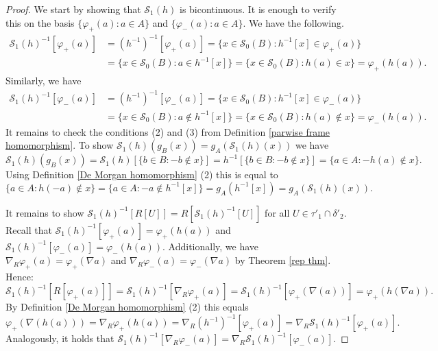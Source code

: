 \documentclass[10pt,a4paper]{amsart}
\begin{document}
\begin{proof}
We start by showing that $\mathcal{S}_1(h)$ is bicontinuous. It is enough to verify this on the basis $\{\varphi_+(a):a\in A\}$ and $\{\varphi_-(a):a\in A\}$.
We have the following.
\begin{align*}
    \mathcal{S}_1(h)^{-1}[\varphi_+(a)]&=(h^{-1})^{-1}[\varphi_+(a)]=\{x \in \mathcal{S}_0(B) : h^{-1}[x] \in \varphi_+(a)\}\\&=\{x \in \mathcal{S}_0(B) : a \in h^{-1}[x]\}=\{x \in \mathcal{S}_0(B) : h(a) \in x\}=\varphi_+(h(a)).
\end{align*}
Similarly, we have
\begin{align*}
    \mathcal{S}_1(h)^{-1}[\varphi_-(a)]&=(h^{-1})^{-1}[\varphi_-(a)]=\{x \in \mathcal{S}_0(B) : h^{-1}[x] \in \varphi_-(a)\}\\&=\{x \in \mathcal{S}_0(B) : a \notin h^{-1}[x]\}=\{x \in \mathcal{S}_0(B) : h(a) \notin x\}=\varphi_-(h(a)).
\end{align*}
It remains to check the conditions (2) and (3) from Definition  \ref{parwise frame homomorphism}.
To show $\mathcal{S}_1(h)(g_B(x))=g_A(\mathcal{S}_1(h)(x))$ we have
$$\mathcal{S}_1(h)(g_B(x))=\mathcal{S}_1(h)[\{b \in B : -b \notin x\}]=h^{-1}[\{b \in B : -b \notin x\}]=\{a \in A : -h(a) \notin x\}.$$ Using Definition \ref{De Morgan homomorphism} (2) this is equal to 
$$\{a \in A : h(-a) \notin x\}=\{a \in A : -a \notin h^{-1}[x]\}=g_A(h^{-1}[x])=g_A(\mathcal{S}_{1}(h)(x)).$$

It remains to show $\mathcal{S}_1(h)^{-1}[R[U]]=R[\mathcal{S}_1(h)^{-1}[U]]$ for all $U \in \tau'_1 \cap \delta'_2$. Recall that $\mathcal{S}_1(h)^{-1}[\varphi_+(a)]=\varphi_+(h(a))$ and $\mathcal{S}_1(h)^{-1}[\varphi_-(a)]=\varphi_-(h(a))$. Additionally, we have $\nabla_R\varphi_+(a)=\varphi_+(\nabla a)$ and $\nabla_R\varphi_-(a)=\varphi_-(\nabla a)$ by Theorem \ref{rep thm}. Hence:  
 $$\mathcal{S}_1(h)^{-1}[R[\varphi_+(a)]]=\mathcal{S}_1(h)^{-1}[\nabla_R \varphi_+(a)]=\mathcal{S}_1(h)^{-1}[\varphi_+(\nabla (a))]=\varphi_+(h (\nabla a)).$$
By Definition \ref{De Morgan homomorphism} (2) this equals
$$\varphi_+ (\nabla (h(a)))=\nabla_R \varphi_+(h(a))=\nabla_R(h^{-1})^{-1}[\varphi_+(a)]=\nabla_R \mathcal{S}_1(h)^{-1}[\varphi_+(a)].$$
Analogously, it holds that $\mathcal{S}_1(h)^{-1}[\nabla_R \varphi_-(a)]=\nabla_R \mathcal{S}_1(h)^{-1}[\varphi_-(a)]$.  
\end{proof}
\end{document}
